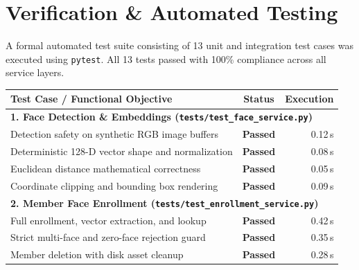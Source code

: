\documentclass[12pt,a4paper]{article}
\begin{document}
\newpage

\section{Verification \& Automated Testing}
\label{sec:testing}

A formal automated test suite consisting of 13 unit and integration test cases was executed using \texttt{pytest}. All 13 tests passed with 100\% compliance across all service layers.

\begin{table}[htbp]
\centering
\renewcommand{\arraystretch}{1.25}
\begin{tabularx}{\textwidth}{X c r}
\toprule
\rowcolor{vitblue!10}
\textbf{Test Case / Functional Objective} & \textbf{Status} & \textbf{Execution} \\
\midrule
\multicolumn{3}{l}{\textbf{\color{vitblue}1. Face Detection \& Embeddings (\texttt{tests/test\_face\_service.py})}} \\
\hspace{0.3cm} Detection safety on synthetic RGB image buffers & \color{green!60!black}\textbf{Passed} & 0.12\,s \\
\hspace{0.3cm} Deterministic 128-D vector shape and normalization & \color{green!60!black}\textbf{Passed} & 0.08\,s \\
\hspace{0.3cm} Euclidean distance mathematical correctness & \color{green!60!black}\textbf{Passed} & 0.05\,s \\
\hspace{0.3cm} Coordinate clipping and bounding box rendering & \color{green!60!black}\textbf{Passed} & 0.09\,s \\
\midrule
\multicolumn{3}{l}{\textbf{\color{vitblue}2. Member Face Enrollment (\texttt{tests/test\_enrollment\_service.py})}} \\
\hspace{0.3cm} Full enrollment, vector extraction, and lookup & \color{green!60!black}\textbf{Passed} & 0.42\,s \\
\hspace{0.3cm} Strict multi-face and zero-face rejection guard & \color{green!60!black}\textbf{Passed} & 0.35\,s \\
\hspace{0.3cm} Member deletion with disk asset cleanup & \color{green!60!black}\textbf{Passed} & 0.28\,s \\

\end{tabularx}
\end{table}
\end{document}
